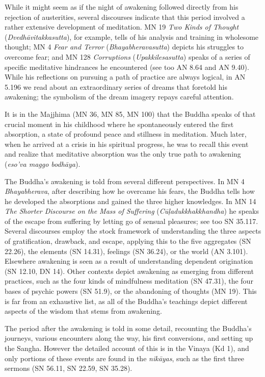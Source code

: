 \documentclass[12pt,openany]{book}%
\begin{document}
While it might seem as if the night of awakening followed directly from his rejection of austerities, several discourses indicate that this period involved a rather extensive development of meditation. MN 19 \textit{Two Kinds of Thought} (\textit{\textsanskrit{Dvedhāvitakkasutta}}), for example, tells of his analysis and training in wholesome thought; MN 4 \textit{Fear and Terror} (\textit{Bhayabheravasutta}) depicts his struggles to overcome fear; and MN 128 \textit{Corruptions} (\textit{Upakkilesasutta}) speaks of a series of specific meditative hindrances he encountered (see too AN 8.64 and AN 9.40). While his reflections on pursuing a path of practice are always logical, in AN 5.196 we read about an extraordinary series of dreams that foretold his awakening; the symbolism of the dream imagery repays careful attention.

It is in the Majjhima (MN 36, MN 85, MN 100) that the Buddha speaks of that crucial moment in his childhood where he spontaneously entered the first absorption, a state of profound peace and stillness in meditation. Much later, when he arrived at a crisis in his spiritual progress, he was to recall this event and realize that meditative absorption was the only true path to awakening (\textit{eso’va maggo \textsanskrit{bodhāya}}).

The Buddha’s awakening is told from several different perspectives. In MN 4 \textit{Bhayabherava}, after describing how he overcame his fears, the Buddha tells how he developed the absorptions and gained the three higher knowledges. In MN 14 \textit{The Shorter Discourse on the Mass of Suffering} (\textit{\textsanskrit{Cūḷadukkhakkhandha}}) he speaks of the escape from suffering by letting go of sensual pleasures; see too SN 35.117. Several discourses employ the stock framework of understanding the three aspects of gratification, drawback, and escape, applying this to the five aggregates (SN 22.26), the elements (SN 14.31), feelings (SN 36.24), or the world (AN 3.101). Elsewhere awakening is seen as a result of understanding dependent origination (SN 12.10, DN 14). Other contexts depict awakening as emerging from different practices, such as the four kinds of mindfulness meditation (SN 47.31), the four bases of psychic powers (SN 51.9), or the abandoning of thoughts (MN 19). This is far from an exhaustive list, as all of the Buddha's teachings depict different aspects of the wisdom that stems from awakening.

The period after the awakening is told in some detail, recounting the Buddha’s journeys, various encounters along the way, his first conversions, and setting up the Sangha. However the detailed account of this is in the Vinaya (Kd 1), and only portions of these events are found in the \textit{\textsanskrit{nikāyas}}, such as the first three sermons (SN 56.11, SN 22.59, SN 35.28).
\end{document}
